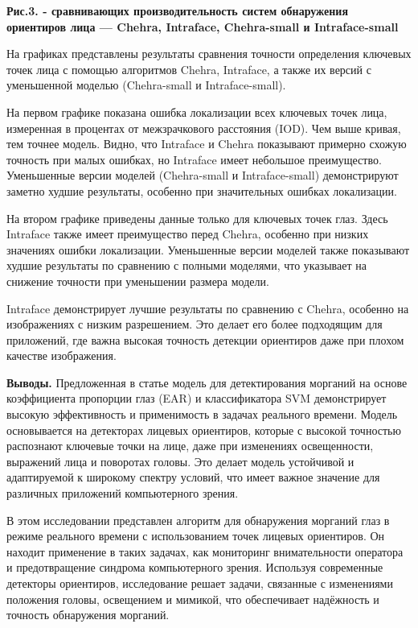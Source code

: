 {\bfseries Рис.3. - сравнивающих производительность систем обнаружения
ориентиров лица --- Chehra, Intraface, Chehra-small и Intraface-small}

На графиках представлены результаты сравнения точности определения
ключевых точек лица с помощью алгоритмов Chehra, Intraface, а также их
версий с уменьшенной моделью (Chehra-small и Intraface-small).

На первом графике показана ошибка локализации всех ключевых точек лица,
измеренная в процентах от межзрачкового расстояния (IOD). Чем выше
кривая, тем точнее модель. Видно, что Intraface и Chehra показывают
примерно схожую точность при малых ошибках, но Intraface имеет небольшое
преимущество. Уменьшенные версии моделей (Chehra-small и
Intraface-small) демонстрируют заметно худшие результаты, особенно при
значительных ошибках локализации.

На втором графике приведены данные только для ключевых точек глаз. Здесь
Intraface также имеет преимущество перед Chehra, особенно при низких
значениях ошибки локализации. Уменьшенные версии моделей также
показывают худшие результаты по сравнению с полными моделями, что
указывает на снижение точности при уменьшении размера модели.

Intraface демонстрирует лучшие результаты по сравнению с Chehra,
особенно на изображениях с низким разрешением. Это делает его более
подходящим для приложений, где важна высокая точность детекции
ориентиров даже при плохом качестве изображения.

{\bfseries Выводы.} Предложенная в статье модель для детектирования
морганий на основе коэффициента пропорции глаз (EAR) и классификатора
SVM демонстрирует высокую эффективность и применимость в задачах
реального времени. Модель основывается на детекторах лицевых ориентиров,
которые с высокой точностью распознают ключевые точки на лице, даже при
изменениях освещенности, выражений лица и поворотах головы. Это делает
модель устойчивой и адаптируемой к широкому спектру условий, что имеет
важное значение для различных приложений компьютерного зрения.

В этом исследовании представлен алгоритм для обнаружения морганий глаз в
режиме реального времени с использованием точек лицевых ориентиров. Он
находит применение в таких задачах, как мониторинг внимательности
оператора и предотвращение синдрома компьютерного зрения. Используя
современные детекторы ориентиров, исследование решает задачи, связанные
с изменениями положения головы, освещением и мимикой, что обеспечивает
надёжность и точность обнаружения морганий.

